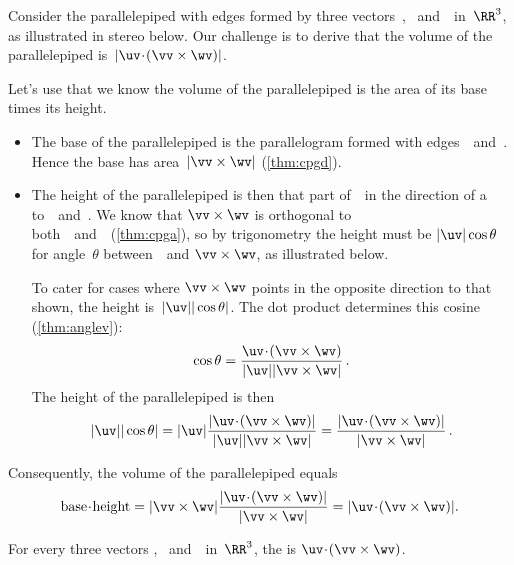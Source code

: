 Consider the parallelepiped with edges formed by three vectors~\uv, \vv\ and~\wv\ in~\(\RR^3\), as illustrated in stereo below.
Our challenge is to derive that the volume of the parallelepiped is~\(|\uv\cdot(\vv\times\wv)|\).
\begin{center}
\end{center}

%
Let's use that we know the volume of the parallelepiped is the area of its base times its height.
\begin{itemize}
\item The base of the parallelepiped is the parallelogram formed with edges~\vv\ and~\wv.
Hence the base has area~\(|\vv\times\wv|\) (\autoref{thm:cpgd}).

\item The height of the parallelepiped is then that part of~\uv\ in the direction of a  to~\vv\ and~\wv.
We know that \(\vv\times\wv\) is orthogonal to both~\vv\ and~\wv\ (\autoref{thm:cpga}), so by trigonometry the height must be \(|\uv|\cos\theta\) for angle~\(\theta\) between~\uv\ and \(\vv\times\wv\), as illustrated below.
\begin{center}
\end{center}
To cater for cases where \(\vv\times\wv\) points in the opposite direction to that shown, the height is~\(|\uv||\cos\theta|\).
The dot product  determines this cosine (\autoref{thm:anglev}):
\begin{equation*}
\cos\theta=\frac{\uv\cdot(\vv\times\wv)}{|\uv||\vv\times\wv|}\,.
\end{equation*}
The height of the parallelepiped is then
\begin{equation*}
|\uv||\cos\theta|=|\uv|\frac{|\uv\cdot(\vv\times\wv)|}{|\uv||\vv\times\wv|}
=\frac{|\uv\cdot(\vv\times\wv)|}{|\vv\times\wv|}\,.
\end{equation*}
\end{itemize}
Consequently, the volume of the parallelepiped equals
\begin{equation*}
\text{base}\cdot\text{height}
=|\vv\times\wv|\frac{|\uv\cdot(\vv\times\wv)|}{|\vv\times\wv|}
=|\uv\cdot(\vv\times\wv)|.
\end{equation*}



\begin{definition} \label{def:sctrpr}
For every three vectors \uv, \vv\ and~\wv\ in~\(\RR^3\), the  is \(\uv\cdot(\vv\times\wv)\).
\end{definition}




